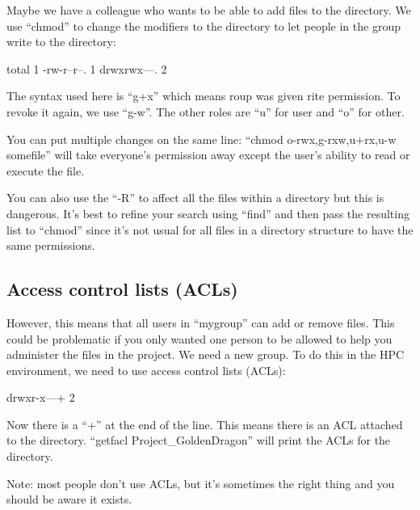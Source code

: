 Maybe we have a colleague who wants to be able to add files to the directory. We
use ``chmod'' to change the modifiers to the directory to let people in the
group write to the directory:

\begin{prompt}
total 1
-rw-r--r--. 1 %
drwxrwx---. 2 %
\end{prompt}

The syntax used here is ``g+x'' which means roup was given rite
permission. To revoke it again, we use ``g-w''. The other roles are ``u'' for
user and ``o'' for other.

You can put multiple changes on the same line: ``chmod o-rwx,g-rxw,u+rx,u-w
somefile'' will take everyone's permission away except the user's ability to
read or execute the file.

You can also use the ``-R'' to affect all the files within a directory but this
is dangerous. It's best to refine your search using ``find'' and then pass the
resulting list to ``chmod'' since it's not usual for all files in a directory
structure to have the same permissions.

\subsection{Access control lists (ACLs)}

However, this means that all users in ``mygroup'' can add or remove files. This
could be problematic if you only wanted one person to be allowed to help you
administer the files in the project. We need a new group. To do this in the HPC
environment, we need to use access control lists (ACLs):

\begin{prompt}
drwxr-x---+ 2 %
\end{prompt}

Now there is a ``+'' at the end of the line. This means there is an ACL attached
to the directory. ``getfacl Project\_GoldenDragon'' will print the ACLs for the
directory.

Note: most people don't use ACLs, but it's sometimes the right thing and you
should be aware it exists.

